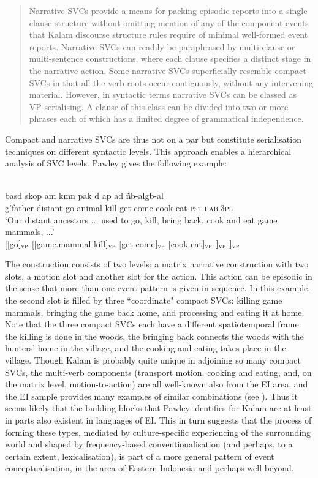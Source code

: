 \begin{quote}Narrative SVCs provide a means for packing episodic reports into a single clause structure without omitting mention of any of the component events that Kalam discourse structure rules require of minimal well-formed event reports. Narrative SVCs can readily be paraphrased by multi-clause or multi-sentence constructions, where each clause specifies a distinct stage in the narrative action. Some narrative SVCs superficially resemble compact SVCs in that all the verb roots occur contiguously, without any intervening material. However, in syntactic terms narrative SVCs can be classed as VP-serialising. A clause of this class can be divided into two or more phrases each of which has a limited degree of grammatical independence. \citep[174]{pawley2008serial}\end{quote}

Compact and narrative SVCs are thus not on a par but constitute serialisation techniques on different syntactic levels. This approach enables a hierarchical analysis of SVC levels. Pawley gives the following example:

\ea 
{}\\
\ea
\gll basd skop am kmn pak d ap ad ñb-algb-al \\
g'father distant go animal kill get come cook eat-\textsc{pst}.\textsc{hab}.\textsc{3}\textsc{pl} \\
\glft `Our distant ancestors ... used to go, kill, bring back, cook and eat game mammals, ...'\\ 
\ex
$[[$go$]_{\textsc{vp}}$ $[[$game.mammal kill$]_{\textsc{vp}}$ $[$get come$]_{\textsc{vp}}$ $[$cook eat$]_{\textsc{vp}}$ $]_{\textsc{vp}}$ $]_{\textsc{vp}}$\\
\z
\z

The construction consists of two levels: a matrix narrative construction with two slots, a motion slot and another slot for the action. This action can be episodic in the sense that more than one event pattern is given in sequence. In this example, the second slot is filled by three ``coordinate" compact SVCs: killing game mammals, bringing the game back home, and processing and eating it at home. Note that the three compact SVCs each have a different spatiotemporal frame: the killing is done in the woods, the bringing back connects the woods with the hunters' home in the village, and the cooking and eating takes place in the village. Though Kalam is probably quite unique in adjoining so many compact SVCs, the multi-verb components (transport motion, cooking and eating, and, on the matrix level, motion-to-action) are all well-known also from the EI area, and the EI sample provides many examples of similar combinations (see ). Thus it seems likely that the building blocks that Pawley identifies for Kalam are at least in parts also existent in languages of EI. This in turn suggests that the process of forming these types, mediated by culture-specific experiencing of the surrounding world and shaped by frequency-based conventionalisation (and perhaps, to a certain extent, lexicalisation), is part of a more general pattern of event conceptualisation, in the area of Eastern Indonesia and perhaps well beyond.

